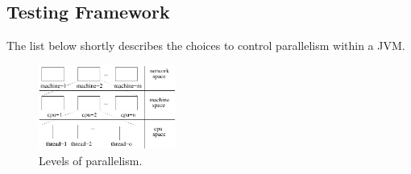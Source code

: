 \subsection{Testing Framework}
\label{sec:frameworks}

The list below shortly describes the choices to control parallelism
within a JVM.

\begin{figure}[t!]
  \centering
  \includegraphics[width=0.4\textwidth]{figs/parallel-levels.pdf}
  \caption{\label{fig:levels}Levels of parallelism.}
\end{figure}

\newcommand{\Seq}{L0}
\newcommand{\ParClassSeqMeth}{L1}
\newcommand{\SeqClassParMeth}{L2}
\newcommand{\ParClassParMeth}{L3}

